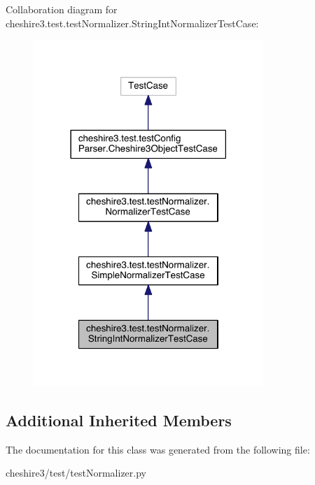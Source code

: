 Collaboration diagram for cheshire3.\-test.\-test\-Normalizer.\-String\-Int\-Normalizer\-Test\-Case\-:
\nopagebreak
\begin{figure}[H]
\begin{center}
\leavevmode
\includegraphics[width=246pt]{classcheshire3_1_1test_1_1test_normalizer_1_1_string_int_normalizer_test_case__coll__graph}
\end{center}
\end{figure}
\subsection*{Additional Inherited Members}


The documentation for this class was generated from the following file\-:\begin{DoxyCompactItemize}
\item 
cheshire3/test/test\-Normalizer.\-py\end{DoxyCompactItemize}
